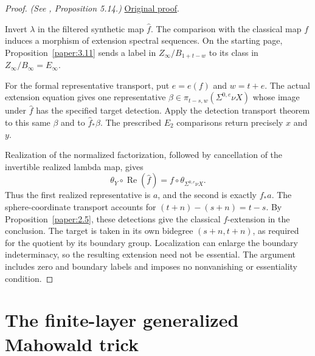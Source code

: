 \begin{proof}
\textit{(See \cite{LWX126}, Proposition 5.14.)} \href{paper/main.tex.html#L1589}{Original proof}.

Invert $\lambda$ in the filtered synthetic map $\widehat f$. The comparison with the classical map $f$ induces a morphism of extension spectral sequences. On the starting page, Proposition~\ref{paper:3.11} sends a label in $Z_\infty/B_{1+t-w}$ to its class in $Z_\infty/B_\infty=E_\infty$.

For the formal representative transport, put $e=e(f)$ and $w=t+e$.
The actual extension equation gives one representative
$\beta\in\pi_{t-s,w}(\Sigma^{0,e}\nu X)$ whose image under $\hat f$
has the specified target detection. Apply the detection transport theorem
to this same $\beta$ and to $\hat f_*\beta$. The prescribed $E_2$
comparisons return precisely $x$ and $y$.

Realization of the normalized factorization, followed by cancellation of
the invertible realized lambda map, gives
\[
\theta_Y\circ\operatorname{Re}(\hat f)
 =f\circ\theta_{\Sigma^{0,e}\nu X}.
\]
Thus the first realized representative is $a$, and the second is exactly
$f_*a$. The sphere-coordinate transport accounts for
$(t+n)-(s+n)=t-s$. By Proposition~\ref{paper:2.5}, these detections give
the classical $f$-extension in the conclusion. The target is taken in its
own bidegree $(s+n,t+n)$, as required for the quotient by its boundary
group. Localization can enlarge the boundary indeterminacy, so the
resulting extension need not be essential. The argument includes zero
and boundary labels and imposes no nonvanishing or essentiality condition.
\end{proof}

\section{The finite-layer generalized Mahowald trick}

